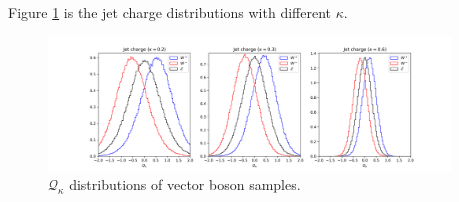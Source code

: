 \documentclass[12pt]{article}
\begin{document}
		Figure \ref{fig:jet_charge_different_kappa} is the jet charge distributions with different $\kappa$.
		\begin{figure}[htpb]
			\centering
			\includegraphics[width=0.95\textwidth]{jet_charge_distribution.png}
			\caption{$\mathcal{Q}_\kappa$ distributions of vector boson samples.}
			\label{fig:jet_charge_different_kappa}
		\end{figure}
\end{document}
